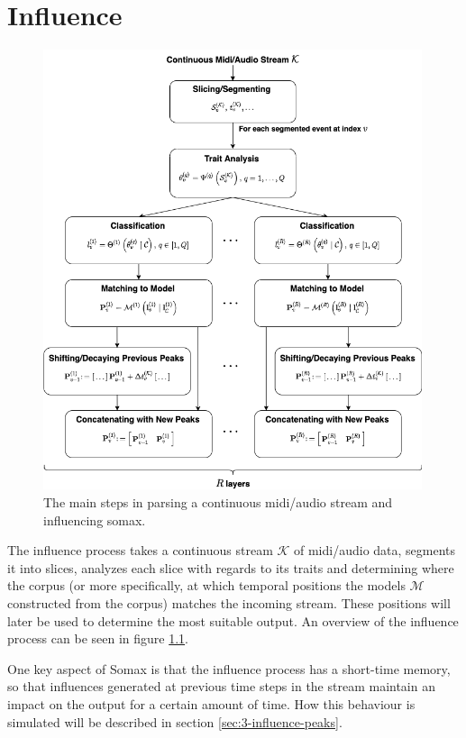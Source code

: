 \chapter{Influence}\label{sec:3-influence}
 \begin{figure}[h!]
    \centering        
 	\includegraphics[width=0.99\textwidth]{figures/3-somax-influence.png}
    \caption{The main steps in parsing a continuous midi/audio stream and influencing somax.}
    \label{fig:3-somax-influence}
\end{figure}

The influence process takes a continuous stream $\mathcal K$ of midi/audio data, segments it into slices, analyzes each slice with regards to its traits and determining where the corpus (or more specifically, at which temporal positions the models $\mathcal M$ constructed from the corpus) matches the incoming stream. These positions will later be used to determine the most suitable output. An overview of the influence process can be seen in figure \ref{fig:3-somax-influence}.

One key aspect of Somax is that the influence process has a short-time memory, so that influences generated at previous time steps in the stream maintain an impact on the output for a certain amount of time. How this behaviour is simulated will be described in section \ref{sec:3-influence-peaks}.




